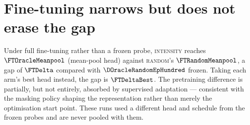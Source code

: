 \section{Fine-tuning narrows but does not erase the gap}

Under full fine-tuning rather than a frozen probe, \textsc{intensity} reaches
$\FTOracleMeanpool$ (mean-pool head) against \textsc{random}'s
$\FTRandomMeanpool$, a gap of $\FTDelta$ compared with $\DOracleRandomEpHundred$
frozen. Taking each arm's best head instead, the gap is $\FTDeltaBest$. The
pretraining difference is partially, but not entirely, absorbed by supervised
adaptation --- consistent with the masking policy shaping the representation
rather than merely the optimisation start point. These runs used a different
head and schedule from the frozen probes and are never pooled with them.

